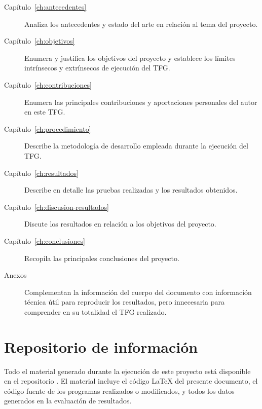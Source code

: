 \begin{description}
    \item[Capítulo~\ref{ch:antecedentes}] Analiza los antecedentes y estado del arte en relación al tema del proyecto.
    \item[Capítulo~\ref{ch:objetivos}] Enumera y justifica los objetivos del proyecto y establece los límites intrínsecos y extrínsecos de ejecución del TFG.
    \item[Capítulo~\ref{ch:contribuciones}] Enumera las principales contribuciones y aportaciones personales del autor en este TFG.
    \item[Capítulo~\ref{ch:procedimiento}] Describe la metodología de desarrollo empleada durante la ejecución del TFG.
    \item[Capítulo~\ref{ch:resultados}] Describe en detalle las pruebas realizadas y los resultados obtenidos.
    \item[Capítulo~\ref{ch:discusion-resultados}] Discute los resultados en relación a los objetivos del proyecto.
    \item[Capítulo~\ref{ch:conclusiones}] Recopila las principales conclusiones del proyecto.
    \item[Anexos] Complementan la información del cuerpo del documento con información técnica útil para reproducir los resultados, pero innecesaria para comprender en su totalidad el TFG realizado.
\end{description}


\section{Repositorio de información}
\label{sec:repositorio}

Todo el material generado durante la ejecución de este proyecto está disponible en el repositorio \thegitrepo{}.  El material incluye el código \LaTeX{} del presente documento, el código fuente de los programas realizados o modificados, y todos los datos generados en la evaluación de resultados.